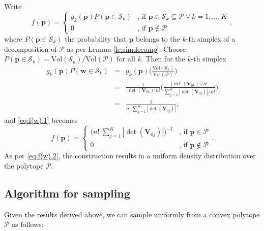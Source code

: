 \documentclass[11pt]{article}
\newcommand{\set}[1]{\mathcal{#1} }
\begin{document}
Write 
\begin{equation}\label{eq:f(w).1}
    f(\bm{p}) = \begin{cases}
        g_k(\bm{p}) P(\bm{p} \in \set{S}_k) & \textrm{, if } \bm{p} \in \set{S}_k \subseteq \set{P} \ \forall \ k =1, \dots, K \\
        0 & \textrm{, if } \bm{p} \notin \set{P} 
        \end{cases}, 
\end{equation}
where $P(\bm{p} \in \set{S}_k)$ the probability that $\bm{p}$ belongs to the $k$-th simplex of a decomposition of $\set{P}$ as per Lemma \ref{le:simdecomp}.  Choose $P(\bm{p} \in \set{S}_k) = \textrm{Vol}(\set{S}_k) / \textrm{Vol}(\set{P})$ for all $k$. 
Then for the $k$-th simplex 
\begin{eqnarray*}\label{eq:f(w).2}
        g_k(\bm{p}) P(\bm{w} \in \set{S}_k) &=& g_k(\bm{p}) \Big( \frac{\textrm{Vol}(\set{S}_k)} {\textrm{Vol}(\set{P})} \Big) \\ 
        &=& \frac{1}{|\det(\bm{V}_{0k})| n!} \Big( \frac{|\det(\bm{V}_{0k})| / n!}{\sum_{j=1}^K{|\det(\bm{V}_{0j})|} / n!} \Big) \\
        &=& \frac{1}{ n! \ \sum_{j=1}^K{|\det(\bm{V}_{0j})|}},
\end{eqnarray*}
%
and \eqref{eq:f(w).1} becomes
%
\begin{equation}\label{eq:f(w).2}
    f(\bm{p}) = 
    \begin{cases}
        \big( n! \ \sum_{j=1}^K{|\det(\bm{V}_{0j})|} \big)^{-1} 
            & \textrm{, if } \bm{p} \in \set{P} \\
        0   & \textrm{, if } \bm{p} \notin \set{P} 
    \end{cases}. 
\end{equation}
As per \eqref{eq:f(w).2}, the construction results in a uniform density distribution over the polytope $\set{P}$.

\subsection{Algorithm for sampling}

Given the results derived above, we can sample uniformly from a convex polytope $\set{P}$ as follows:
\end{document}

